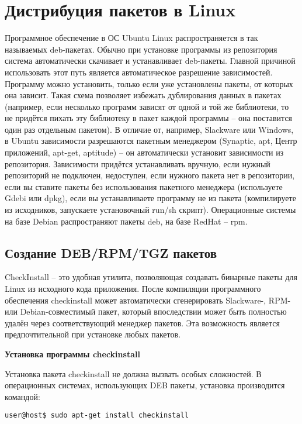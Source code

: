 \newpage
\section{Дистрибуция пакетов в Linux}

Программное обеспечение в ОС Ubuntu Linux распространяется в так называемых deb-пакетах. Обычно при установке программы из репозитория система автоматически скачивает и устанавливает deb-пакеты. Главной причиной использовать этот путь является автоматическое разрешение зависимостей. Программу можно установить, только если уже установлены пакеты, от которых она зависит. Такая схема позволяет избежать дублирования данных в пакетах (например, если несколько программ зависят от одной и той же библиотеки, то не придётся пихать эту библиотеку в пакет каждой программы -- она поставится один раз отдельным пакетом). В отличие от, например, Slackware или Windows, в Ubuntu зависимости разрешаются пакетным менеджером (Synaptic, apt, Центр приложений, apt-get, aptitude) -- он автоматически установит зависимости из репозитория. Зависимости придётся устанавливать вручную, если нужный репозиторий не подключен, недоступен, если нужного пакета нет в репозитории, если вы ставите пакеты без использования пакетного менеджера (используете Gdebi или dpkg), если вы устанавливаете программу не из пакета (компилируете из исходников, запускаете установочный run/sh скрипт). Операционные системы на базе Debian распространяют пакеты deb, на базе RedHat -- rpm.

\subsection{Создание DEB/RPM/TGZ пакетов}

CheckInstall -- это удобная утилита, позволяющая создавать бинарные пакеты для Linux из исходного кода приложения. После компиляции программного обеспечения checkinstall может автоматически сгенерировать Slackware-, RPM- или Debian-совместимый пакет, который впоследствии может быть полностью удалён через соответствующий менеджер пакетов. Эта возможность является предпочтительной при установке любых пакетов\cite{Cit4}.

\textbf{Установка программы checkinstall}

Установка пакета checkinstall не должна вызвать особых сложностей. В операционных системах, использующих DEB пакеты, установка производится командой:

\begin{Verbatim}[frame=single]
user@host$ sudo apt-get install checkinstall
\end{Verbatim}

